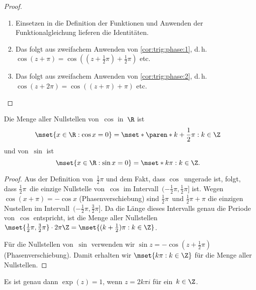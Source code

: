 \documentclass[a4paper]{article}
\begin{document}
\begin{proof}\leavevmode
    \begin{enumerate}
        \item Einsetzen in die Definition der Funktionen und Anwenden der Funktionalgleichung lieferen die Identitäten.
        \item Das folgt aus zweifachem Anwenden von \cref{cor:trig:phase:1}, d.\,h.\ $\cos(z+\pi) = \cos((z+\frac{1}{2}\pi) + \frac{1}{2}\pi)$ etc.
        \item Das folgt aus zweifachem Anwenden von \cref{cor:trig:phase:2}, d.\,h.\ $\cos(z+2\pi) = \cos((z+\pi) +\pi)$ etc.\qedhere
    \end{enumerate}
\end{proof}

\begin{theorem}[Nullstellen in~$\R$]
    Die Menge aller Nullstellen von~$\cos$ in~$\R$ ist
    \begin{equation*}
        \mset{x \in \R : \cos x = 0} = \mset*{\paren*{k+\frac{1}{2}}\pi : k \in \Z}
    \end{equation*}
    und von~$\sin$ ist
    \begin{equation*}
        \mset{x \in \R : \sin x = 0} = \mset*{k\pi : k \in \Z}.
    \end{equation*}
\end{theorem}

\begin{proof}
    Aus der Definition von~$\frac{1}{2}\pi$ und dem Fakt, dass $\cos$~ungerade ist, folgt, dass $\frac{1}{2}\pi$~die einzige Nullstelle von~$\cos$ im Intervall~$(-\frac{1}{2}\pi, \frac{1}{2}\pi]$ ist. Wegen $\cos(x+\pi) = -\cos x$ (Phasenverschiebung) sind $\frac{1}{2}\pi$~und $\frac{1}{2}\pi+\pi$ die einzigen Nustellen im Intervall~$(-\frac{1}{2}\pi, \frac{3}{2}\pi]$. Da die Länge dieses Intervalls genau die Periode von~$\cos$ entspricht, ist die Menge aller Nullstellen $\mset{\frac{1}{2}\pi, \frac{3}{2}\pi} \cdot 2\pi\Z = \mset{(k+\frac{1}{2})\pi : k \in \Z}$.

    Für die Nullstellen von~$\sin$ verwenden wir $\sin z = -\cos(z+\frac{1}{2}\pi)$ (Phasenverschiebung). Damit erhalten wir $\mset{k\pi : k \in \Z}$ für die Menge aller Nullstellen.
\end{proof}

\begin{corollary}\label{cor:complex:exp1}
    Es ist genau dann $\exp(z) = 1$, wenn $z = 2k\pi i$ für ein~$k \in \Z$.
\end{corollary}
\end{document}
